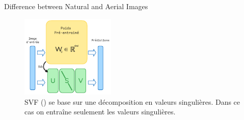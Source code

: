 \begin{subsectionframemod}{Difference between Natural and Aerial Images}

    \begin{figure}
        \includegraphics[width=0.4\textwidth]{Figures/svf.png}
        \caption{SVF (\cite{sun2022singular}) se base sur une décomposition en valeurs singulières. Dans ce cas on entraîne seulement les valeurs singulières.}
    \end{figure}


\end{subsectionframemod}